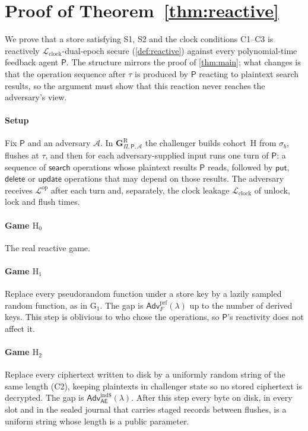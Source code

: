 \section{Proof of Theorem~\ref{thm:reactive}}
\label{supp:reactive}

We prove that a store satisfying S1, S2 and the clock conditions C1--C3 is reactively
$\mathcal{L}_{\mathrm{clock}}$-dual-epoch secure (\cref{def:reactive}) against every polynomial-time
feedback agent $\mathsf{P}$. The structure mirrors the proof of \cref{thm:main}; what changes is that
the operation sequence after $\tau$ is produced by $\mathsf{P}$ reacting to plaintext search results,
so the argument must show that this reaction never reaches the adversary's view.

\paragraph{Setup} Fix $\mathsf{P}$ and an adversary $\mathcal{A}$. In
$\mathbf{G}^{\mathrm{R}}_{\Pi,\mathsf{P},\mathcal{A}}$ the challenger builds cohort~H from $\sigma_b$,
flushes at $\tau$, and then for each adversary-supplied input runs one turn of $\mathsf{P}$: a
sequence of $\mathsf{search}$ operations whose plaintext results $\mathsf{P}$ reads, followed by
$\mathsf{put}$, $\mathsf{delete}$ or $\mathsf{update}$ operations that may depend on those results.
The adversary receives $\mathcal{L}^{\mathrm{op}}$ after each turn and, separately, the clock leakage
$\mathcal{L}_{\mathrm{clock}}$ of unlock, lock and flush times.

\paragraph{Game $\mathrm{H}_0$} The real reactive game.

\paragraph{Game $\mathrm{H}_1$} Replace every pseudorandom function under a store key by a lazily
sampled random function, as in $\mathrm{G}_1$. The gap is $\mathsf{Adv}^{\mathrm{prf}}_F(\lambda)$ up
to the number of derived keys. This step is oblivious to who chose the operations, so $\mathsf{P}$'s
reactivity does not affect it.

\paragraph{Game $\mathrm{H}_2$} Replace every ciphertext written to disk by a uniformly random string
of the same length (C2), keeping plaintexts in challenger state so no stored ciphertext is decrypted.
The gap is $\mathsf{Adv}^{\mathrm{ind\$}}_{\mathsf{AE}}(\lambda)$. After this step every byte on disk,
in every slot and in the sealed journal that carries staged records between flushes, is a uniform
string whose length is a public parameter.

